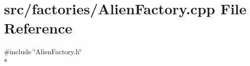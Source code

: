 \section{src/factories/\-Alien\-Factory.cpp File Reference}
\label{_alien_factory_8cpp}
{\ttfamily \#include \char`\"{}Alien\-Factory.\-h\char`\"{}}\\*
